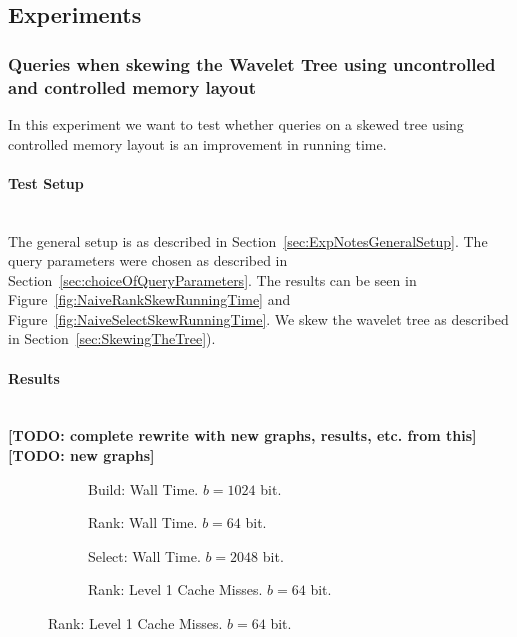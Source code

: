 \subsection{Experiments}

\subsubsection{Queries when skewing the Wavelet Tree using uncontrolled and controlled memory layout}
In this experiment we want to test whether queries on a skewed tree using controlled memory layout is an improvement in running time.

\paragraph{Test Setup}~\\
The general setup is as described in Section~\ref{sec:ExpNotesGeneralSetup}.
The query parameters were chosen as described in Section~\ref{sec:choiceOfQueryParameters}.
The results can be seen in Figure~\ref{fig:NaiveRankSkewRunningTime} and Figure~\ref{fig:NaiveSelectSkewRunningTime}.
We skew the wavelet tree as described in Section~\ref{sec:SkewingTheTree}).

\paragraph{Results}~\\
\textbf{[TODO: complete rewrite with new graphs, results, etc. from this]}
\textbf{[TODO: new graphs]}

\begin{figure}\tiny
\begin{subfigure}{0.48\textwidth}
	
	\caption{Build: Wall Time. $b=1024$ bit.}
	\label{fig:CumulativeSumSkew_n8as16_Build}
\end{subfigure}
\hfill
\begin{subfigure}{0.48\textwidth}
	
	\caption{Rank: Wall Time. $b=64$ bit.}
	\label{fig:CumulativeSumSkew_n8as16_Rank}
\end{subfigure}

\begin{subfigure}{0.48\textwidth}
	
	\caption{Select: Wall Time. $b=2048$ bit.}
	\label{fig:CumulativeSumSkew_n8as16_Select}
\end{subfigure}
\hfill
\begin{subfigure}{0.48\textwidth}
	
	\caption{Rank: Level 1 Cache Misses. $b=64$ bit.}
	\label{fig:CumulativeSumSkew_n8as16_Rank_L1CM}
\end{subfigure}
\end{figure}
\restoregeometry

